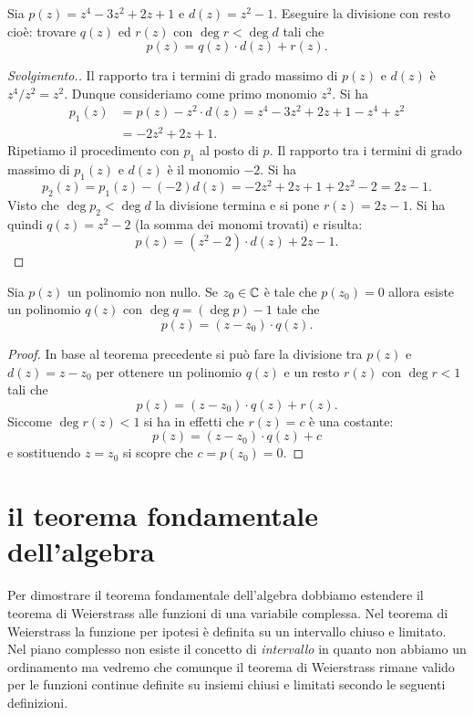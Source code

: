 \begin{exercise}
Sia $p(z) = z^4-3 z^2 + 2z + 1$ e $d(z) = z^2-1$.
Eseguire la divisione con resto cioè:
trovare $q(z)$ ed $r(z)$ con $\deg r < \deg d$ tali che
\[
p(z) = q(z) \cdot d(z) + r(z).
\]
\end{exercise}
%
\begin{proof}[Svolgimento.]
Il rapporto tra i termini di grado massimo di $p(z)$ e $d(z)$ è $z^4/z^2 = z^2$. Dunque consideriamo come primo monomio $z^2$.
Si ha
\begin{align*}
  p_1(z)
  &= p(z) - z^2 \cdot d(z)
  = z^4-3z^2+2z+1 - z^4+z^2 \\
  &= -2z^2+2z+1.
\end{align*}
Ripetiamo il procedimento con $p_1$ al posto di $p$.
Il rapporto tra i termini di grado massimo di $p_1(z)$ e $d(z)$
è il monomio $-2$. Si ha
\[
  p_2(z) = p_1(z) - (-2) d(z) = -2z^2 + 2z + 1 + 2z^2 - 2 = 2z -1.
\]
Visto che $\deg p_2 < \deg d$ la divisione termina e si pone $r(z) = 2z-1$. Si ha quindi $q(z) = z^2 - 2$ (la somma dei monomi trovati)
e risulta:
\[
  p(z) = (z^2 - 2)\cdot d(z) + 2z -1.
\]
\end{proof}

\begin{theorem}[Ruffini]
\label{th:Ruffini}
Sia $p(z)$ un polinomio non nullo.
Se $z_0 \in \mathbb C$ è tale che $p(z_0)=0$
allora esiste un polinomio $q(z)$ con $\deg q = (\deg p) - 1$
tale che
\[
  p(z) = (z-z_0)\cdot q(z).
\]
\end{theorem}
%
\begin{proof}
In base al teorema precedente si può fare la divisione tra $p(z)$ e $d(z) = z- z_0$ per ottenere un polinomio $q(z)$ e un resto $r(z)$ con $\deg r < 1$ tali che
\[
  p(z) = (z-z_0)\cdot q(z) + r(z).
\]
Siccome $\deg r(z) < 1$ si ha in effetti che $r(z)=c$ è una costante:
\[
  p(z) = (z-z_0) \cdot q(z) + c
\]
e sostituendo $z=z_0$ si scopre che $c = p(z_0) = 0$.
\end{proof}

\section{il teorema fondamentale dell'algebra}

Per dimostrare il teorema fondamentale dell'algebra dobbiamo estendere il teorema di Weierstrass alle funzioni di una variabile complessa.
Nel teorema di Weierstrass la funzione per ipotesi è definita su un intervallo chiuso e limitato. Nel piano complesso non esiste il concetto di \emph{intervallo} in quanto non abbiamo un ordinamento ma vedremo che comunque il teorema di Weierstrass rimane valido per le funzioni continue definite su insiemi chiusi e limitati secondo le seguenti definizioni.

